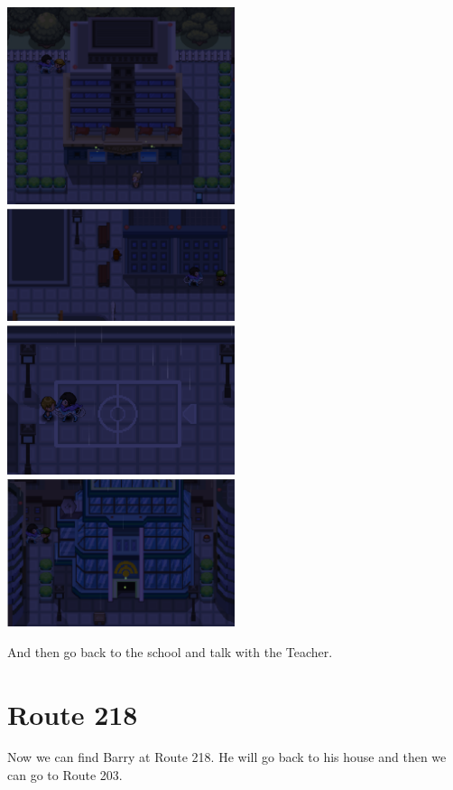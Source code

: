 \documentclass[11pt]{article}
\begin{document}
\includegraphics[width=0.5\textwidth]{walkthrough/Sinnoh/Jubilife-student-1}
\includegraphics[width=0.5\textwidth]{walkthrough/Sinnoh/Jubilife-student-2}
\includegraphics[width=0.5\textwidth]{walkthrough/Sinnoh/Jubilife-student-3}
\includegraphics[width=0.5\textwidth]{walkthrough/Sinnoh/Jubilife-student-4}

And then go back to the school and talk with the Teacher.

\section{Route 218}\label{sec:Route_218}

Now we can find Barry at Route 218.
He will go back to his house and then we can go to Route 203.
\end{document}
